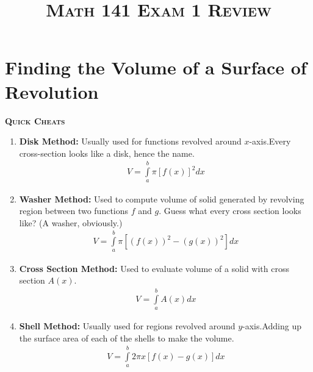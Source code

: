 \documentclass[12pt]{amsart}
\theoremstyle{plain}
\theoremstyle{definition}
\begin{document}
\title{\textsc{Math 141 Exam 1 Review}}
\maketitle

\section*{Finding the Volume of a Surface of Revolution}
\begin{mdframed}[style=MyFrame]
\begin{center}
\textsc{\textbf{Quick Cheats}}
\begin{enumerate}
\item \textbf{Disk Method:} Usually used for functions revolved around $x$-axis.Every cross-section looks like a disk, hence the name.
\begin{align*}
V = \int\limits_{a}^{b}\pi [f(x)]^2 dx
\end{align*}
\item \textbf{Washer Method:} Used to compute volume of solid generated by revolving region between two functions $f$ and $g$. Guess what every cross section looks like? (A washer, obviously.) 
\begin{align*}
V = \int\limits_{a}^{b}\pi[\left( f(x) \right)^2-\left( g(x) \right)^2]dx
\end{align*}
\item \textbf{Cross Section Method:} Used to evaluate volume of a solid with cross section $A(x)$. 
\begin{align*}
V = \int\limits_{a}^{b}A(x) dx
\end{align*}
\item \textbf{Shell Method:} Usually used for regions  revolved around $y$-axis.Adding up the surface area of each of the shells to make the volume.
\begin{align*}
V = \int\limits_{a}^{b}2\pi x [f(x) -g(x)] dx
\end{align*}

\end{enumerate}
\end{center}
\end{mdframed}
\end{document}
